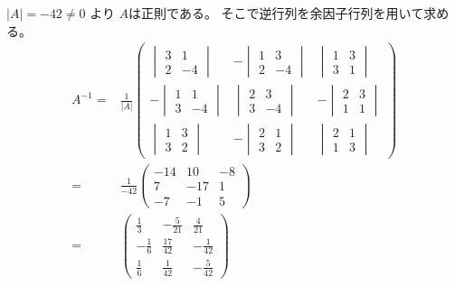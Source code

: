 \documentclass[10pt,b5paper]{ltjsarticle}
\begin{document}
\begin{enumerate}
       $\lvert A \rvert = -42 \ne 0$ より $A$は正則である。
       そこで逆行列を余因子行列を用いて求める。
        \begin{align}
         A^{-1} =&
          \frac{1}{\lvert A \rvert}
          \begin{pmatrix}
           \begin{vmatrix} 3 & 1\\ 2 & -4\end{vmatrix} &
           -\begin{vmatrix} 1 & 3\\ 2 & -4\end{vmatrix} &
           \begin{vmatrix} 1 & 3\\ 3 & 1\end{vmatrix}\\[10pt]
           -\begin{vmatrix} 1 & 1\\ 3 & -4\end{vmatrix} &
           \begin{vmatrix} 2 & 3\\ 3 & -4\end{vmatrix} &
           -\begin{vmatrix} 2 & 3\\ 1 & 1\end{vmatrix}\\[10pt]
           \begin{vmatrix} 1 & 3\\ 3 & 2\end{vmatrix} &
           -\begin{vmatrix} 2 & 1\\ 3 & 2\end{vmatrix} &
           \begin{vmatrix} 2 & 1\\ 1 & 3\end{vmatrix}
          \end{pmatrix}\\
         =& \frac{1}{-42}
          \begin{pmatrix}
           -14 & 10 & -8\\
           7 & -17 & 1\\
           -7 & -1 & 5
          \end{pmatrix}\\
         =& 
          \begin{pmatrix}
           \frac{1}{3} & -\frac{5}{21} & \frac{4}{21}\\[3pt]
           -\frac{1}{6} & \frac{17}{42} & -\frac{1}{42}\\[3pt]
           \frac{1}{6} & \frac{1}{42} & -\frac{5}{42}
          \end{pmatrix}
        \end{align}


\end{enumerate}
\end{document}
